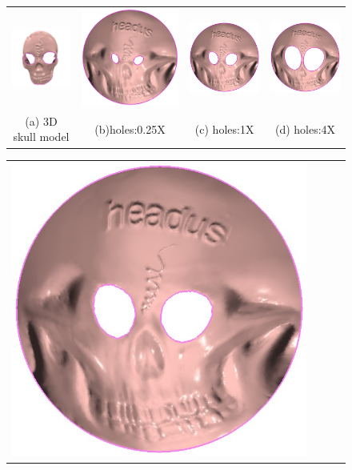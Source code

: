 \documentclass[runningheads]{llncs}
\begin{document}
{ \setlength{\tabcolsep}{0pt}
\begin{figure}[!htbp]
\centering
\begin{tabular}{cccc}
\includegraphics[height=0.25\textwidth]{./figs/roi_skull/skull_a.jpg}&
\includegraphics[height=0.25\textwidth]{./figs/roi_skull/skull_b.jpg}&
\includegraphics[height=0.25\textwidth]{./figs/roi_skull/skull_c.jpg}&
\includegraphics[height=0.25\textwidth]{./figs/roi_skull/skull_d.jpg}\\
(a) 3D skull model &(b)holes:0.25X &(c) holes:1X &(d) holes:4X \\
\end{tabular}
\begin{tabular}{cccc}
\includegraphics[height=0.25\textwidth]{./figs/roi_skull/skull_e.jpg}&

\end{tabular}
\end{figure}}
\end{document}

